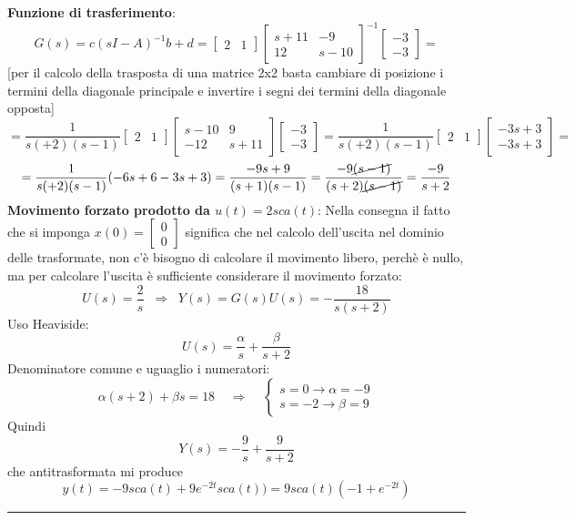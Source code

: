 \textbf{Funzione di trasferimento}:
\[
    G(s) = c(sI-A)^{-1} b +d = \left[\begin{matrix}
        2 &1
    \end{matrix}\right] \left[\begin{matrix}
        s+11 & -9 \\ 12 & s-10
    \end{matrix}\right]^{-1} \left[\begin{matrix}
        -3\\-3
    \end{matrix}\right] =
\]
[per il calcolo della trasposta di una matrice 2x2 basta cambiare di posizione i termini della diagonale principale e invertire i segni dei termini della diagonale opposta]
\[
    = \frac{1}{s(+2)(s-1)} \left[\begin{matrix}
        2 &1
    \end{matrix}\right] \left[\begin{matrix}
        s-10 & 9 \\ -12 & s+11
    \end{matrix}\right] \left[\begin{matrix}
        -3\\-3
    \end{matrix}\right] = \frac{1}{s(+2)(s-1)} \left[\begin{matrix}
        2 & 1
    \end{matrix}\right] \left[\begin{matrix}
        -3s+3\\-3s + 3
    \end{matrix}\right] =
\]
\[
    = \frac{1}{s(+2)(s-1)} (-6s + 6 -3s +3) = \frac{-9s +9}{(s+1)(s-1)} = \frac{-9 \cancel{(s-1)}}{(s+2)\cancel{(s-1)}} = \frac{-9}{s+2}
\]
\newline
\textbf{Movimento forzato prodotto da $u(t) = 2 sca(t)$}:\newline
Nella consegna il fatto che si imponga $x(0) = \left[\begin{matrix}
    0\\0
\end{matrix}\right]$ significa che nel calcolo dell'uscita nel dominio delle trasformate, non c'è bisogno di calcolare il movimento libero, perchè è nullo, ma per calcolare l'uscita è sufficiente considerare il movimento forzato:
\[
    U(s) = \frac{2}{s} \;\; \Rightarrow  \;\; Y(s) = G(s) U(s) = - \frac{18}{s(s+2)}
\]
Uso Heaviside:
\[
    U(s) = \frac{\alpha}{s} + \frac{\beta}{s+2}
\]
Denominatore comune e uguaglio i numeratori:
\[
    \alpha(s+2) + \beta s = 18 \;\;\;\; \Rightarrow \;\;\;\; \begin{cases}
        s= 0 \rightarrow \alpha = -9\\
        s = -2 \rightarrow  \beta = 9
    \end{cases}
\]
Quindi 
\[
    Y(s) = -\frac{9}{s} + \frac{9}{s+2}
\]
che antitrasformata mi produce
\[
    y(t) = - 9 sca(t) + 9 e^{-2t} sca(t)) = 9 sca(t) (-1 + e^{-2t})
\]
\rule{\textwidth}{0,4pt}
